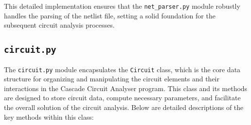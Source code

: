 \documentclass[conference]{IEEEtran}
\begin{document}
This detailed implementation ensures that the \texttt{net\_parser.py} module robustly handles the parsing of the netlist 
file, setting a solid foundation for the subsequent circuit analysis processes.
\subsection{\textbf{\texttt{circuit.py}}}
The \texttt{circuit.py} module encapsulates the \texttt{Circuit} class, which is the core data structure for organizing 
and manipulating the circuit elements and their interactions in the Cascade Circuit Analyser program. This class and its 
methods are designed to store circuit data, compute necessary parameters, and facilitate the overall solution of the circuit 
analysis. Below are detailed descriptions of the key methods within this class:
\end{document}
